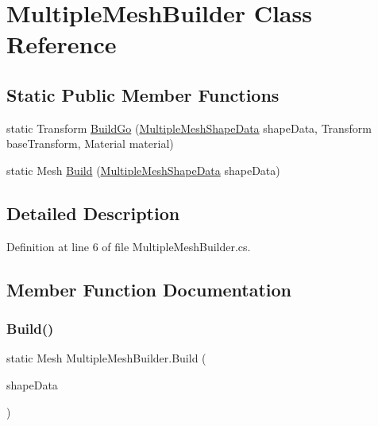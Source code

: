 \hypertarget{class_multiple_mesh_builder}{}\section{Multiple\+Mesh\+Builder Class Reference}
\label{class_multiple_mesh_builder}
\subsection*{Static Public Member Functions}
\begin{DoxyCompactItemize}
\item 
static Transform \mbox{\hyperlink{class_multiple_mesh_builder_a527f861cbe6b6cdd4ced52287f789054}{Build\+Go}} (\mbox{\hyperlink{class_multiple_mesh_shape_data}{Multiple\+Mesh\+Shape\+Data}} shape\+Data, Transform base\+Transform, Material material)
\item 
static Mesh \mbox{\hyperlink{class_multiple_mesh_builder_a04d492393576d5da12920f4785d1faac}{Build}} (\mbox{\hyperlink{class_multiple_mesh_shape_data}{Multiple\+Mesh\+Shape\+Data}} shape\+Data)
\end{DoxyCompactItemize}


\subsection{Detailed Description}


Definition at line 6 of file Multiple\+Mesh\+Builder.\+cs.



\subsection{Member Function Documentation}
\mbox{\label{class_multiple_mesh_builder_a04d492393576d5da12920f4785d1faac}} 
\subsubsection{\texorpdfstring{Build()}{Build()}}
{\footnotesize\ttfamily static Mesh Multiple\+Mesh\+Builder.\+Build (\begin{DoxyParamCaption}\item[{\mbox{\hyperlink{class_multiple_mesh_shape_data}{Multiple\+Mesh\+Shape\+Data}}}]{shape\+Data }\end{DoxyParamCaption})\hspace{0.3cm}{\ttfamily [static]}}



